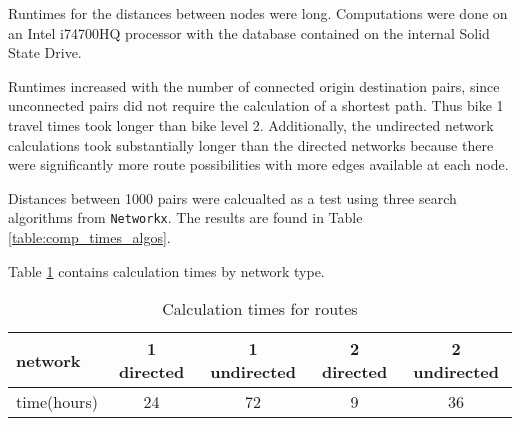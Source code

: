 Runtimes for the distances between nodes were long. Computations were done on an Intel i74700HQ processor with the database contained on the internal Solid State Drive. 

Runtimes increased with the number of connected origin destination pairs, since unconnected pairs  did not require the calculation of a shortest path. Thus bike 1 travel times took longer than bike level 2. Additionally, the undirected network calculations took substantially longer than the directed networks because there were significantly more route possibilities with more edges available at each node. 

Distances between 1000 pairs were calcualted as a test using three search algorithms from \texttt{Networkx}. The results are found in Table \ref{table:comp_times_algos}. 

Table \ref{table:net_calc_times} contains calculation times by network type. 

\begin{table}[]
\centering
\begin{tabular}{@{}lcccc@{}}
network     & 1 directed  & 1 undirected & 2 directed  & 2 undirected \\ 
\midrule
time(hours) & 24 & 72  & 9 & 36 \\ \bottomrule
\end{tabular}
\caption{Calculation times for routes}
\label{table:net_calc_times}
\end{table}

